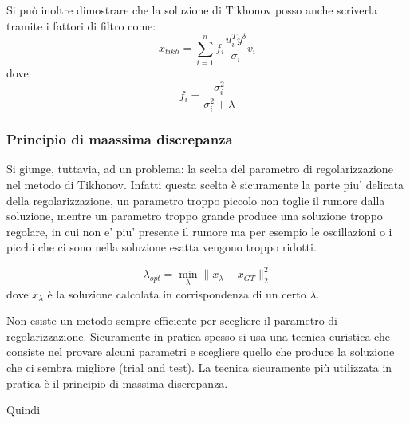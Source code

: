 Si può inoltre dimostrare che  la soluzione di Tikhonov posso anche scriverla tramite i fattori di filtro come:
\[
    x_{tikh} = \sum_{i=1}^{n}     f_i \frac{u^T_i y^\delta}{\sigma_i}v_i
\]
dove:
\[
    f_i = \frac{
        \sigma^2_i
    }{
        \sigma^2_i + \lambda  
    }
\]
\subsubsection{Principio di maassima discrepanza}

Si giunge, tuttavia, ad un problema: la scelta del parametro di regolarizzazione nel metodo di Tikhonov. Infatti questa scelta è sicuramente la parte piu’ delicata della
regolarizzazione, un parametro troppo piccolo non
toglie il rumore dalla soluzione, mentre un parametro troppo grande produce una
soluzione troppo regolare, in cui non e’ piu’ presente il rumore ma per esempio le
oscillazioni o i picchi che ci sono nella soluzione esatta vengono troppo ridotti.

\[
    \lambda_{opt} = \min_\lambda\|x_\lambda - x_{GT}\|_2^2
\]
dove $x_\lambda$ è la soluzione calcolata in corrispondenza di un certo $\lambda$.

Non esiste un metodo sempre efficiente per scegliere il parametro di regolarizzazione.
Sicuramente in pratica spesso si usa una tecnica euristica che consiste nel provare
alcuni parametri e scegliere quello che produce la soluzione che ci sembra migliore (trial and test). La tecnica sicuramente più utilizzata in pratica è il principio di massima discrepanza.


Quindi 
